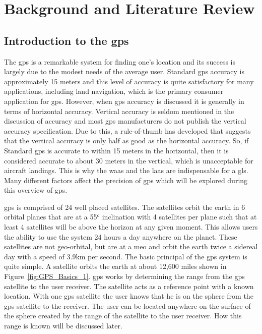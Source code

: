 \acresetall
\chapter{Background and Literature Review}
\label{ch:background}

\section{Introduction to the \ac{gps}}\label{introduction-to-gps}

The \ac{gps} is a remarkable system for finding one's location and its success is largely due to the modest needs of the average user. Standard \ac{gps} accuracy is approximately 15 meters\citep[]{GPS_FOR_DUMMIES} and this level of accuracy is quite satisfactory for many applications, including land navigation, which is the primary consumer application for \ac{gps}. However, when \ac{gps} accuracy is discussed it is generally in terms of horizontal accuracy.  Vertical accuracy is seldom mentioned in the discussion of accuracy and most \ac{gps} manufacturers do not publish the vertical accuracy specification.  Due to this, a rule-of-thumb has developed that suggests that the vertical accuracy is only half as good as the horizontal accuracy.  So, if Standard \ac{gps} is accurate to within 15 meters in the horizontal, then it is considered accurate to about 30 meters in the vertical, which is unacceptable for aircraft landings. This is why the \ac{waas} and the \ac{laas} are indispensable for a \ac{gls}.  Many different factors affect the precision of \ac{gps} which will be explored during this overview of \ac{gps}.

\ac{gps} is comprised of 24 well placed satellites. The satellites orbit the earth in 6 orbital planes that are at a 55$^o$ inclination with 4 satellites per plane such that at least 4 satellites will be above the horizon at any given moment. This allows users the ability to use the system 24 hours a day anywhere on the planet. These satellites are not geo-orbital, but are at a \ac{meo} and orbit the earth twice a sidereal day with a speed of 3.9km per second.  The basic principal of the \ac{gps} system is quite simple.  A satellite orbits the earth at about 12,600 miles shown in Figure~\ref{fig:GPS_Basics_1}. \ac{gps} works by determining the range from the \ac{gps} satellite to the user receiver. The satellite acts as a reference point with a known location.  With one \ac{gps} satellite the user knows that he is on the sphere from the \ac{gps} satellite to the receiver. The user can be located anywhere on the surface of the sphere created by the range of the satellite to the user receiver. How this range is known will be discussed later.

